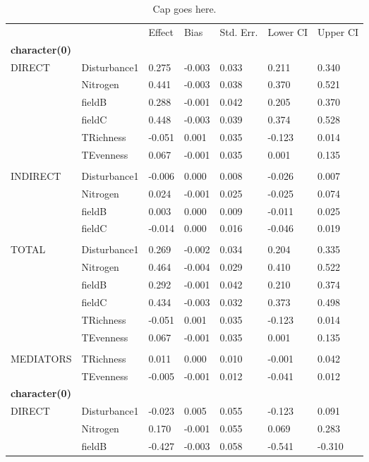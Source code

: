 \begin{longtable}[c]{l l l l l l l }
\caption{Cap goes here. \label{tbl:table-name}}\\
 & & Effect & Bias & Std.  Err. & Lower  CI & Upper  CI\\
\textbf{character(0)} &  &  &  &  &  &\\
\hline
 DIRECT & Disturbance1 & 0.275 & -0.003 & 0.033 & 0.211 & 0.340\\
 & Nitrogen & 0.441 & -0.003 & 0.038 & 0.370 & 0.521\\
 & fieldB & 0.288 & -0.001 & 0.042 & 0.205 & 0.370\\
 & fieldC & 0.448 & -0.003 & 0.039 & 0.374 & 0.528\\
 & TRichness & -0.051 & 0.001 & 0.035 & -0.123 & 0.014\\
 & TEvenness & 0.067 & -0.001 & 0.035 & 0.001 & 0.135\\
 & & & & & & \\
 INDIRECT & Disturbance1 & -0.006 & 0.000 & 0.008 & -0.026 & 0.007\\
 & Nitrogen & 0.024 & -0.001 & 0.025 & -0.025 & 0.074\\
 & fieldB & 0.003 & 0.000 & 0.009 & -0.011 & 0.025\\
 & fieldC & -0.014 & 0.000 & 0.016 & -0.046 & 0.019\\
 & & & & & & \\
 TOTAL & Disturbance1 & 0.269 & -0.002 & 0.034 & 0.204 & 0.335\\
 & Nitrogen & 0.464 & -0.004 & 0.029 & 0.410 & 0.522\\
 & fieldB & 0.292 & -0.001 & 0.042 & 0.210 & 0.374\\
 & fieldC & 0.434 & -0.003 & 0.032 & 0.373 & 0.498\\
 & TRichness & -0.051 & 0.001 & 0.035 & -0.123 & 0.014\\
 & TEvenness & 0.067 & -0.001 & 0.035 & 0.001 & 0.135\\
 & & & & & & \\
 MEDIATORS &TRichness & 0.011 & 0.000 & 0.010 & -0.001 & 0.042\\
 & TEvenness & -0.005 & -0.001 & 0.012 & -0.041 & 0.012\\
\textbf{character(0)} &  &  &  &  &  &\\
\hline
 DIRECT & Disturbance1 & -0.023 & 0.005 & 0.055 & -0.123 & 0.091\\
 & Nitrogen & 0.170 & -0.001 & 0.055 & 0.069 & 0.283\\
 & fieldB & -0.427 & -0.003 & 0.058 & -0.541 & -0.310\\

\end{longtable}
